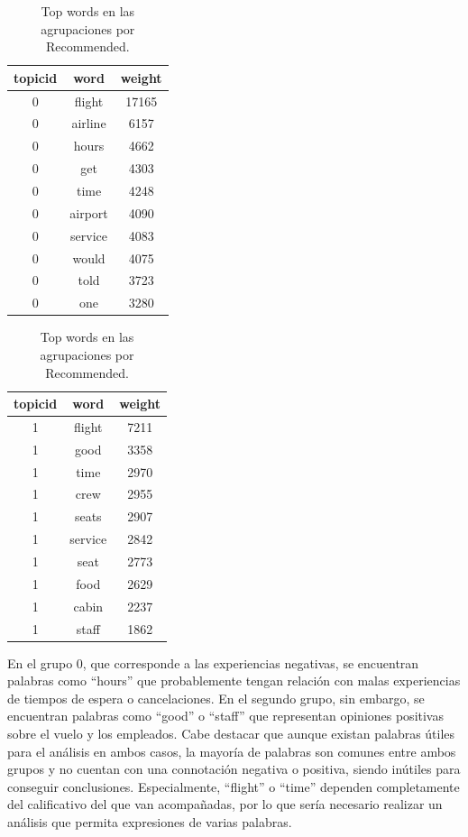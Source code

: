 \documentclass[es]{uc3mreport}
\begin{document}
\begin{report}
\begin{table}[H]
    \center
    \begin{tabular}{@{}ccc@{}}
        \toprule
        topicid & word & weight \\
        \midrule
        0 & flight  & 17165 \\
        0 & airline & 6157  \\
        0 & hours   & 4662  \\
        0 & get     & 4303  \\
        0 & time    & 4248  \\
        0 & airport & 4090  \\
        0 & service & 4083  \\
        0 & would   & 4075  \\
        0 & told    & 3723  \\
        0 & one     & 3280  \\
        \bottomrule
    \end{tabular}
    \hspace{2.5mm}
    \begin{tabular}{@{}ccc@{}}
        \toprule
        topicid & word & weight \\
        \midrule
        1 & flight  & 7211  \\
        1 & good    & 3358  \\
        1 & time    & 2970  \\
        1 & crew    & 2955  \\
        1 & seats   & 2907  \\
        1 & service & 2842  \\
        1 & seat    & 2773  \\
        1 & food    & 2629  \\
        1 & cabin   & 2237  \\
        1 & staff   & 1862  \\
        \bottomrule
    \end{tabular}
    \caption{Top words en las agrupaciones por Recommended.}
\end{table}

En el grupo 0, que corresponde a las experiencias negativas, se encuentran
palabras como ``hours'' que probablemente tengan relación con malas experiencias
de tiempos de espera o cancelaciones. En el segundo grupo, sin embargo, se
encuentran palabras como ``good'' o ``staff'' que representan opiniones positivas
sobre el vuelo y los empleados. Cabe destacar que aunque existan palabras
útiles para el análisis en ambos casos, la mayoría de palabras son comunes
entre ambos grupos y no cuentan con una connotación negativa o positiva, siendo
inútiles para conseguir conclusiones. Especialmente, ``flight'' o ``time'' dependen
completamente del calificativo del que van acompañadas, por lo que sería
necesario realizar un análisis que permita expresiones de varias palabras.


\end{report}
\end{document}
